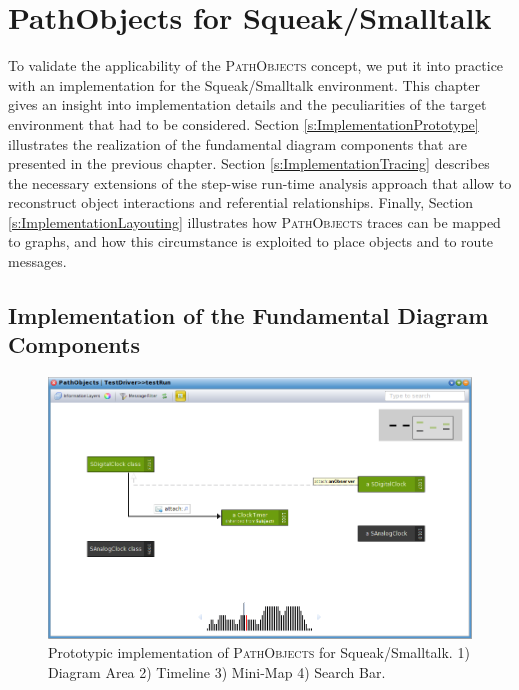\chapter{PathObjects for Squeak/Smalltalk}
\label{c:implementation}
To validate the applicability of the \textsc{PathObjects} concept, we put it into practice with an implementation for the Squeak/Smalltalk environment.
This chapter gives an insight into implementation details and the peculiarities of the target environment that had to be considered.
Section \ref{s:ImplementationPrototype} illustrates the realization of the fundamental diagram components that are presented in the previous chapter.
Section \ref{s:ImplementationTracing} describes the necessary extensions of the step-wise run-time analysis approach that allow to reconstruct object interactions and referential relationships.
Finally, Section \ref{s:ImplementationLayouting} illustrates how \textsc{PathObjects} traces can be mapped to graphs, and how this circumstance is exploited to place objects and to route messages.

\section[Implementation of the Fundamental Diagram Components]{Implementation of the Fundamental Diagram Components%
}
\label{s:ImplementationPrototype}

\begin{figure}
	\centering
	\includegraphics[width=1\textwidth]{../images/04-ImplMainWindow}
	\caption[PathObjects for Squeak/Smalltalk]{Prototypic implementation of \textsc{PathObjects} for Squeak/Smalltalk. 1) Diagram Area 2) Timeline 3) Mini-Map 4) Search Bar.}
	\label{fig:ImplementationMainWindow}
\end{figure}

